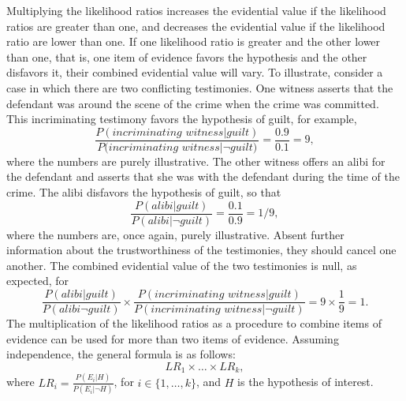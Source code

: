 \documentclass[10pt]{article}
\begin{document}
Multiplying the likelihood ratios increases the evidential 
value if the likelihood ratios are greater than one, and decreases the evidential value if the likelihood ratio 
are lower than one. If one likelihood ratio is greater and the other lower than one, that is, 
one item of evidence favors the hypothesis and the other disfavors it, 
their combined evidential value will vary.  To illustrate, consider a case in which 
there are two conflicting testimonies. 
One witness asserts that the defendant was around the scene of the 
crime when the crime was committed. This incriminating testimony 
favors the hypothesis of guilt, for example,
%
\[\frac{P(\textit{incriminating witness}| \textit{guilt})}{P(\textit{incriminating witness} | \neg \textit{guilt)}}=\frac{0.9}{0.1}=9,\]
%
where the numbers are purely illustrative. 
The other witness offers an alibi for the defendant and asserts that she was with the defendant 
during the time of the crime. The alibi disfavors the hypothesis of guilt, so that 
%
\[\frac{P(\textit{alibi}| \textit{guilt})}{P(\textit{alibi}| \neg \textit{guilt})}=\frac{0.1}{0.9}=1/9,\] 
%
where the numbers are, once again, purely illustrative. 
Absent further information about the trustworthiness of the testimonies, 
they should cancel one another. 
%
%
The combined evidential value of the two testimonies is null, as expected, for
%
\[\frac{P(\textit{alibi}|  \textit{guilt})}{P(\textit{alibi}  \neg \textit{guilt})}\times \frac{P(\textit{incriminating witness}| \textit{guilt} )}{P(\textit{incriminating witness}| \neg\textit{guilt})}=9\times \frac{1}{9}=1.\] 
%
The multiplication of the likelihood ratios as a procedure to combine items of evidence 
can be used for more than two items of evidence. 
Assuming independence, the general 
formula is as follows:
%
\[LR_1\times \dots \times LR_k,\]
%
where $LR_i=\frac{P(E_i | H)}{P(E_i | \neg H)}$, for $i\in \{1, \dots, k\}$, and $H$ is the hypothesis of interest.
\end{document}
